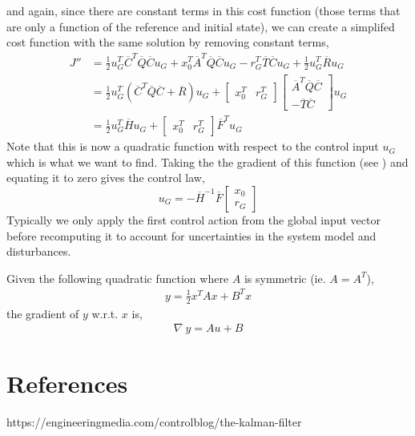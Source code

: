 \documentclass{article}
\newcommand{\doublebar}[1]{\overline{#1}}
\begin{document}
and again, since there are constant terms in this cost function (those terms that are only a function of the reference
and initial state), we can create a simplifed cost function with the same solution by removing constant terms,
\begin{align}
    J''
    &=
    \tfrac{1}{2}u_G^T\doublebar{C}^T\doublebar{Q}\doublebar{C}u_G
    + x_0^T\doublebar{A}^T\doublebar{Q}\doublebar{C}u_G
    - r_G^T\doublebar{T}\doublebar{C}u_G
    + \tfrac{1}{2}u_G^T\doublebar{R}u_G
    \\
    &=
    \tfrac{1}{2}u_G^T\left(\doublebar{C}^T\doublebar{Q}\doublebar{C} + \doublebar{R}\right)u_G
    +
    \begin{bmatrix} x_0^T & r_G^T \end{bmatrix}
    \begin{bmatrix} \doublebar{A}^T\doublebar{Q}\doublebar{C} \\ -\doublebar{T}\doublebar{C} \end{bmatrix} u_G
    \\
    &= \tfrac{1}{2}u_G^T\doublebar{H}u_G +  \begin{bmatrix} x_0^T & r_G^T \end{bmatrix}\doublebar{F}^Tu_G
\end{align}
Note that this is now a quadratic function with respect to the control input $u_G$ which is what we want to find.
Taking the the gradient of this function (see ) and equating it to zero gives the
control law,
\begin{equation}
    u_G = - \doublebar{H}^{-1}\doublebar{F}\begin{bmatrix} x_0 \\ r_G \end{bmatrix}
\end{equation}
Typically we only apply the first control action from the global input vector before recomputing it to account for
uncertainties in the system model and disturbances.

\begin{tcolorbox}[title={Gradient of Quadratic Functions}]
    Given the following quadratic function where $A$ is symmetric (ie. $A=A^T$),
    \begin{align}
        y = \frac{1}{2}x^TAx + B^Tx
        \label{eq:grad-a}
    \end{align}
    the gradient of $y$ w.r.t. $x$ is,
    \begin{align}
        \nabla~y = Au + B
        \label{eq:grad-b}
    \end{align}
\end{tcolorbox}

\section{References}

https://engineeringmedia.com/controlblog/the-kalman-filter
\end{document}
